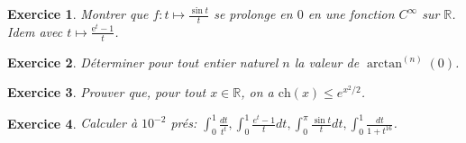 \documentclass[12pt,a4paper]{article}
\newcommand{\R}{\mathbb{R}}
\newcommand{\E}{\mathrm{e}}
\theoremstyle{break}
\theoremstyle{break}
\newtheorem{Exo}{Exercice}
\begin{document}
%	
%		
%			
%			
%		
%		
	
\begin{Exo}
		 Montrer que $f:t\mapsto \frac{\sin t }{t}$ se prolonge en $0$ en une fonction $C^{\infty}$ sur $\R$. Idem avec $t\mapsto \frac{\E^t-1}{t}$.
\end{Exo}

\begin{Exo}
	 Déterminer pour tout entier naturel $n$ la valeur de $\arctan^{(n)}(0)$.
\end{Exo}

\begin{Exo}
	 Prouver que, pour tout $x\in\mathbb R$, on a $\textrm{ch}(x)\leqslant e^{x^2/2}$.
\end{Exo}


\begin{Exo}
	 Calculer \`{a} $10^{-2}$ prés: $\int_0^1\frac{dt}{t^t},\int_{0}^{1}\frac{e^{t}-1}{t}	dt,\int_{0}^{\pi }\frac{\sin t}{t}dt,\int_{0}^{1}\frac{dt}{1+t^{16}}$.
\end{Exo}
\end{document}
